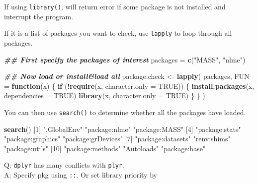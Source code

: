 \documentclass[
]{book}
\newenvironment{Shaded}{\begin{snugshade}}{\end{snugshade}}
\newcommand{\AttributeTok}[1]{\textcolor[rgb]{0.13,0.29,0.53}{#1}}
\newcommand{\ConstantTok}[1]{\textcolor[rgb]{0.56,0.35,0.01}{#1}}
\newcommand{\ControlFlowTok}[1]{\textcolor[rgb]{0.13,0.29,0.53}{\textbf{#1}}}
\newcommand{\DecValTok}[1]{\textcolor[rgb]{0.00,0.00,0.81}{#1}}
\newcommand{\DocumentationTok}[1]{\textcolor[rgb]{0.56,0.35,0.01}{\textbf{\textit{#1}}}}
\newcommand{\FunctionTok}[1]{\textcolor[rgb]{0.13,0.29,0.53}{\textbf{#1}}}
\newcommand{\NormalTok}[1]{#1}
\newcommand{\OtherTok}[1]{\textcolor[rgb]{0.56,0.35,0.01}{#1}}
\newcommand{\SpecialCharTok}[1]{\textcolor[rgb]{0.81,0.36,0.00}{\textbf{#1}}}
\newcommand{\StringTok}[1]{\textcolor[rgb]{0.31,0.60,0.02}{#1}}
\theoremstyle{definition}
\theoremstyle{definition}
\theoremstyle{definition}
\theoremstyle{definition}
\theoremstyle{remark}
\begin{document}
If using \texttt{library()}, will return error if some package is not installed and interrupt the program.

If it is a list of packages you want to check, use \texttt{lapply} to loop through all packages.

\begin{Shaded}
\begin{Highlighting}[]
\DocumentationTok{\#\# First specify the packages of interest}
\NormalTok{packages }\OtherTok{=} \FunctionTok{c}\NormalTok{(}\StringTok{"MASS"}\NormalTok{, }\StringTok{"nlme"}\NormalTok{)}

\DocumentationTok{\#\# Now load or install\&load all}
\NormalTok{package.check }\OtherTok{\textless{}{-}} \FunctionTok{lapply}\NormalTok{(}
\NormalTok{  packages,}
  \AttributeTok{FUN =} \ControlFlowTok{function}\NormalTok{(x) \{}
    \ControlFlowTok{if}\NormalTok{ (}\SpecialCharTok{!}\FunctionTok{require}\NormalTok{(x, }\AttributeTok{character.only =} \ConstantTok{TRUE}\NormalTok{)) \{}
      \FunctionTok{install.packages}\NormalTok{(x, }\AttributeTok{dependencies =} \ConstantTok{TRUE}\NormalTok{)}
      \FunctionTok{library}\NormalTok{(x, }\AttributeTok{character.only =} \ConstantTok{TRUE}\NormalTok{)}
\NormalTok{    \}}
\NormalTok{  \}}
\NormalTok{)}
\end{Highlighting}
\end{Shaded}

You can then use \texttt{search()} to determine whether all the packages have loaded.

\begin{Shaded}
\begin{Highlighting}[]
\FunctionTok{search}\NormalTok{()}
\NormalTok{ [}\DecValTok{1}\NormalTok{] }\StringTok{".GlobalEnv"}        \StringTok{"package:nlme"}      \StringTok{"package:MASS"}     
\NormalTok{ [}\DecValTok{4}\NormalTok{] }\StringTok{"package:stats"}     \StringTok{"package:graphics"}  \StringTok{"package:grDevices"}
\NormalTok{ [}\DecValTok{7}\NormalTok{] }\StringTok{"package:datasets"}  \StringTok{"renv:shims"}        \StringTok{"package:utils"}    
\NormalTok{[}\DecValTok{10}\NormalTok{] }\StringTok{"package:methods"}   \StringTok{"Autoloads"}         \StringTok{"package:base"}     
\end{Highlighting}
\end{Shaded}

Q: \texttt{dplyr} has many conflicts with \texttt{plyr}.\\
A: Specify pkg using \texttt{::}. Or set library priority by
\end{document}
